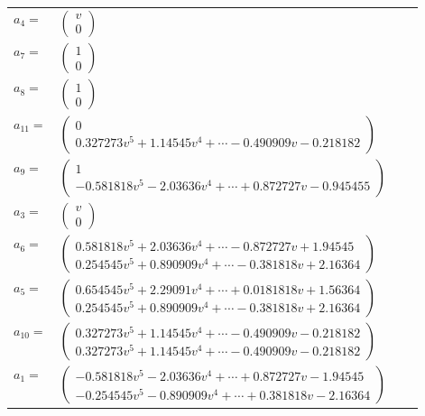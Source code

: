 \documentclass[1p]{elsarticle_modified}
\theoremstyle{definition}
\begin{document}
\begin{tabular}{m{7pt} m{180pt} m{7pt} m{180pt} }
\flushright $a_{4}=$&$\begin{pmatrix}v\\0\end{pmatrix}$ \\
\flushright $a_{7}=$&$\begin{pmatrix}1\\0\end{pmatrix}$ \\
\flushright $a_{8}=$&$\begin{pmatrix}1\\0\end{pmatrix}$ \\
\flushright $a_{11}=$&$\begin{pmatrix}0\\0.327273 v^{5}+1.14545 v^{4}+\cdots-0.490909 v-0.218182\end{pmatrix}$ \\
\flushright $a_{9}=$&$\begin{pmatrix}1\\-0.581818 v^{5}-2.03636 v^{4}+\cdots+0.872727 v-0.945455\end{pmatrix}$ \\
\flushright $a_{3}=$&$\begin{pmatrix}v\\0\end{pmatrix}$ \\
\flushright $a_{6}=$&$\begin{pmatrix}0.581818 v^{5}+2.03636 v^{4}+\cdots-0.872727 v+1.94545\\0.254545 v^{5}+0.890909 v^{4}+\cdots-0.381818 v+2.16364\end{pmatrix}$ \\
\flushright $a_{5}=$&$\begin{pmatrix}0.654545 v^{5}+2.29091 v^{4}+\cdots+0.0181818 v+1.56364\\0.254545 v^{5}+0.890909 v^{4}+\cdots-0.381818 v+2.16364\end{pmatrix}$ \\
\flushright $a_{10}=$&$\begin{pmatrix}0.327273 v^{5}+1.14545 v^{4}+\cdots-0.490909 v-0.218182\\0.327273 v^{5}+1.14545 v^{4}+\cdots-0.490909 v-0.218182\end{pmatrix}$ \\
\flushright $a_{1}=$&$\begin{pmatrix}-0.581818 v^{5}-2.03636 v^{4}+\cdots+0.872727 v-1.94545\\-0.254545 v^{5}-0.890909 v^{4}+\cdots+0.381818 v-2.16364\end{pmatrix}$ \\

\end{tabular}
\end{document}
